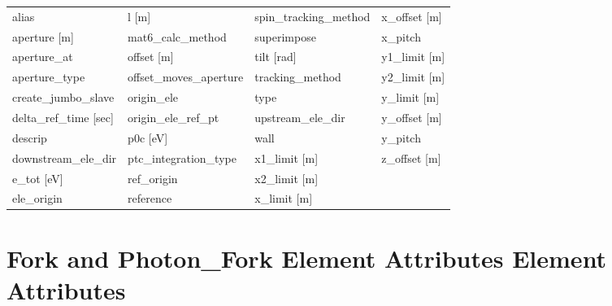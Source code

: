  \begin{tabular}{llll} \toprule
alias                          & l [m]                          & spin_tracking_method           & x_offset [m]                   \\
aperture [m]                   & mat6_calc_method               & superimpose                    & x_pitch                        \\
aperture_at                    & offset [m]                     & tilt [rad]                     & y1_limit [m]                   \\
aperture_type                  & offset_moves_aperture          & tracking_method                & y2_limit [m]                   \\
create_jumbo_slave             & origin_ele                     & type                           & y_limit [m]                    \\
delta_ref_time [sec]           & origin_ele_ref_pt              & upstream_ele_dir               & y_offset [m]                   \\
descrip                        & p0c [eV]                       & wall                           & y_pitch                        \\
downstream_ele_dir             & ptc_integration_type           & x1_limit [m]                   & z_offset [m]                   \\
e_tot [eV]                     & ref_origin                     & x2_limit [m]                   &                                \\
ele_origin                     & reference                      & x_limit [m]                    &                                \\
 \bottomrule
 \end{tabular}
 \vfill
 
 \section{Fork and Photon_Fork Element Attributes Element Attributes}
 \label{s:list.fork}
 
